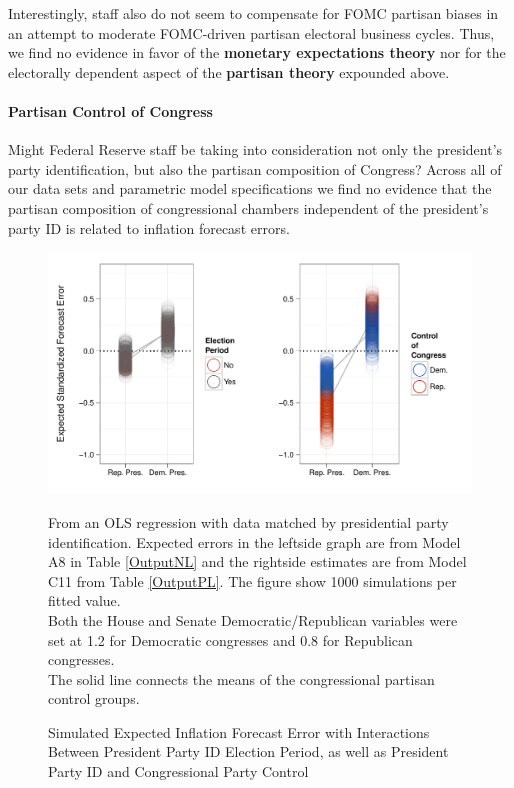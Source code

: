 \documentclass[a4paper]{article}\usepackage{graphicx, color}
\newenvironment{knitrout}{}{} %
\begin{document}
Interestingly, staff also do not seem to compensate for FOMC partisan biases in an attempt to moderate FOMC-driven partisan electoral business cycles. Thus, we find no evidence in favor of the {\bf{monetary expectations theory}} nor for the electorally dependent aspect of the {\bf{partisan theory}} expounded above.

\paragraph{Partisan Control of Congress}

Might Federal Reserve staff be taking into consideration not only the president's party identification, but also the partisan composition of Congress?  Across all of our data sets and parametric model specifications we find no evidence that the partisan composition of congressional chambers independent of the president's party ID is related to inflation forecast errors. 

\begin{figure}[t]
    \caption{Simulated Expected Inflation Forecast Error with Interactions Between President Party ID Election Period, as well as President Party ID and Congressional Party Control}
    \label{InterPlot}
    \begin{center}

\begin{knitrout}
\color{fgcolor}\includegraphics[width=0.95\linewidth]{figure/InterPlot} 
\end{knitrout}


    \end{center}
    \begin{singlespace}
        {\scriptsize{From an OLS regression with data matched by presidential party identification. Expected errors in the leftside graph are from Model A8 in Table \ref{OutputNL} and the rightside estimates are from Model C11 from Table \ref{OutputPL}. The figure show 1000 simulations per fitted value. \\ Both the House and Senate Democratic/Republican variables were set at 1.2 for Democratic congresses and 0.8 for Republican congresses. \\ The solid line connects the means of the congressional partisan control groups.}}
    \end{singlespace}
\end{figure}
\end{document}
